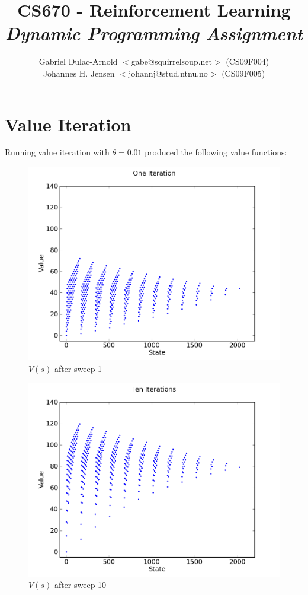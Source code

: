 \documentclass[a4paper]{article}
\author{Gabriel Dulac-Arnold $<$gabe@squirrelsoup.net$>$ (CS09F004) \\
Johannes H. Jensen $<$johannj@stud.ntnu.no$>$ (CS09F005)}
\title{CS670 - Reinforcement Learning \\
\emph{Dynamic Programming Assignment}}
\begin{document}
\setlength{\parskip}{2ex}
\maketitle

\section{Value Iteration}

Running value iteration with $\theta=0.01$ produced the following value functions:

\begin{figure}[h]
\center
\includegraphics[scale=0.75]{../graphs/value_iteration/one_iteration.png}
\caption{$V(s)$ after sweep 1}
\end{figure}

\begin{figure}[h]
\center
\includegraphics[scale=0.75]{../graphs/value_iteration/ten_iterations.png}
\caption{$V(s)$ after sweep 10}
\end{figure}
\end{document}

